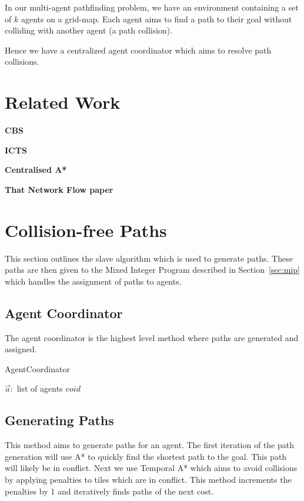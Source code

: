 \documentclass[a4paper,11pt]{article}
\begin{document}
In our multi-agent pathfinding problem, we have an environment containing a set of $k$ agents on a grid-map. Each agent aims to find a path to their goal without colliding with another agent (a path collision).

Hence we have a centralized agent coordinator which aims to resolve path collisions.

\section{Related Work}
\textbf{CBS}

\textbf{ICTS}

\textbf{Centralised A*}

\textbf{That Network Flow paper}

\section{Collision-free Paths}
This section outlines the slave algorithm which is used to generate paths. These paths are then given to the Mixed Integer Program described in Section~\ref{sec:mip} which handles the assignment of paths to agents.

\subsection{Agent Coordinator}

The agent coordinator is the highest level method where paths are generated and assigned. 

\begin{algorithm}
	\caption{AgentCoordinator}\label{alg_AgentCoordinator}
	\begin{algorithmic}[1]
		\Require $\vec{a}:$ list of agents
		\Ensure $void$
		\Do
	\end{algorithmic}
\end{algorithm}

\subsection{Generating Paths}
This method aims to generate paths for an agent. The first iteration of the path generation will use A* to quickly find the shortest path to the goal. This path will likely be in conflict. Next we use Temporal A* which aims to avoid collisions by applying penalties to tiles which are in conflict. This method increments the penalties by 1 and iteratively finds paths of the next cost. 
\end{document}
